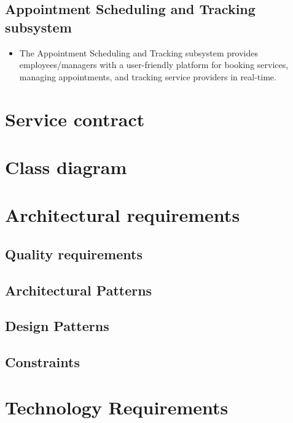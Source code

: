 \documentclass{article}
\begin{document}
\subsection*{Appointment Scheduling and Tracking subsystem}
\begin{itemize}
    \item The Appointment Scheduling and Tracking subsystem provides employees/managers with a user-friendly platform for booking services, managing appointments, and tracking service providers in real-time.
\end{itemize}

	
	\newpage
	
	\section*{Service contract}	
	
	\newpage
	
	\section*{Class diagram}
	
	\newpage
	
	\section*{Architectural requirements}
	
	\subsection*{Quality requirements}	
	\subsection*{Architectural Patterns}	
	\subsection*{Design Patterns}	
	\subsection*{Constraints}	
	
	\newpage
	\section*{Technology Requirements}
	
	
\end{document}
